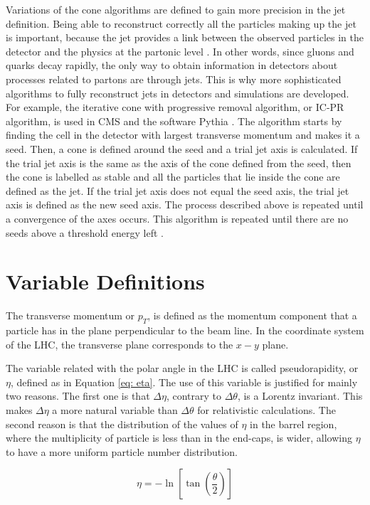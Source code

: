 Variations of the cone algorithms are defined to gain more precision in the jet definition. Being able to reconstruct correctly all the particles making up the jet is important, because the jet provides a link between the observed particles in the detector and the physics at the partonic level \cite{Jets}. In other words, since gluons and quarks decay rapidly, the only way to obtain information in detectors about processes related to partons are through jets. This is why more sophisticated algorithms to fully reconstruct jets in detectors and simulations are developed. For example, the iterative cone with progressive removal algorithm, or IC-PR algorithm, is used in CMS and the software Pythia \cite{Jets}. The algorithm starts by finding the cell in the detector with largest transverse momentum and makes it a seed. Then, a cone is defined around the seed and a trial jet axis is calculated. If the trial jet axis is the same as the axis of the cone defined from the seed, then the cone is labelled as stable and all the particles that lie inside the cone are defined as the jet. If the trial jet axis does not equal the seed axis, the trial jet axis is defined as the new seed axis. The process described above is repeated until a convergence of the axes occurs. This algorithm is repeated until there are no seeds above a threshold energy left \cite{Jets}.  


\section{Variable Definitions}

The transverse momentum or $p_{T}$, is defined as the momentum component that a particle has in the plane perpendicular to the beam line. In the coordinate system of the LHC, the transverse plane corresponds to the $x-y$ plane.

The variable related with the polar angle in the LHC is called pseudorapidity, or $\eta$, defined as in Equation \ref{eq: eta}. The use of this variable is justified for mainly two reasons. The first one is that $\Delta \eta$, contrary to $\Delta \theta$, is a Lorentz invariant. This makes $\Delta \eta$ a more natural variable than $\Delta \theta$ for relativistic calculations. The second reason is that the distribution of the values of $\eta$ in the barrel region, where the multiplicity of particle is less than in the end-caps, is wider, allowing $\eta$ to have a more uniform particle number distribution.

\begin{equation}
 \eta = -\ln\left[\tan\left(\frac{\theta}{2}\right)\right]
 \label{eq: eta}
\end{equation}


